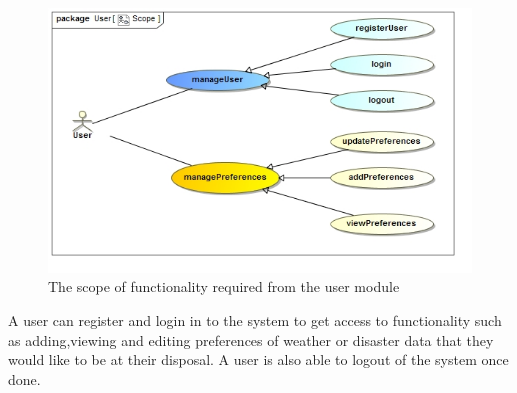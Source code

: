 
\begin{figure}[H]
	\centering
	\includegraphics[scale=0.8]{../images/funcReq/UserScope.jpg}
	\caption{The scope of functionality required from the user module \label{overflow}}
\end{figure}

A user can register and login in to the system to get access to functionality such as adding,viewing and editing preferences of weather or disaster data that they would like to be at their disposal. A user is also able to logout of the system once done.